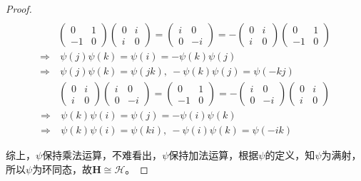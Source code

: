\documentclass[12pt, a4paper, oneside]{ctexart}
\begin{document}
\begin{proof}
\begin{equation*}
\begin{aligned}
        \end{aligned}
    \end{equation*}
    \begin{equation*}
        \begin{aligned}
            &\begin{pmatrix}
                0&1\\-1&0
            \end{pmatrix}\begin{pmatrix}
                0&i\\i&0
            \end{pmatrix}
            =\begin{pmatrix}
                i&0\\0&-i
            \end{pmatrix}=-\begin{pmatrix}
                0&i\\i&0
            \end{pmatrix}
            \begin{pmatrix}
                0&1\\-1&0
            \end{pmatrix}\\
            \Rightarrow&\ \psi(j)\psi(k)=\psi(i)=-\psi(k)\psi(j)\\
            \Rightarrow&\ \psi(j)\psi(k)=\psi(jk),\ -\psi(k)\psi(j)=\psi(-kj)
        \end{aligned}
    \end{equation*}
    \begin{equation*}
        \begin{aligned}
            &\begin{pmatrix}
                0&i\\i&0
            \end{pmatrix}\begin{pmatrix}
                i&0\\0&-i
            \end{pmatrix}
            =\begin{pmatrix}
                0&1\\-1&0
            \end{pmatrix}=-\begin{pmatrix}
                i&0\\0&-i
            \end{pmatrix}
            \begin{pmatrix}
                0&i\\i&0
            \end{pmatrix}\\
            \Rightarrow&\ \psi(k)\psi(i)=\psi(j)=-\psi(i)\psi(k)\\
            \Rightarrow&\ \psi(k)\psi(i)=\psi(ki),\ -\psi(i)\psi(k)=\psi(-ik)
        \end{aligned}
    \end{equation*}

    综上，$\psi$保持乘法运算，不难看出，$\psi$保持加法运算，根据$\psi$的定义，知$\psi$为满射，所以$\psi$为环同态，故$\mathbf{H}\cong\mathcal{H}$。
\end{proof}
\end{document}
